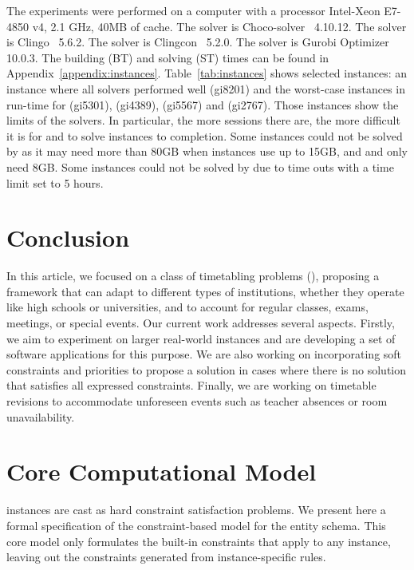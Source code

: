 \documentclass[runningheads]{llncs}
\begin{document}
%
 







The experiments were performed on a computer with a processor Intel-Xeon E7-4850 v4, 2.1 GHz, 40MB of cache.
The \CP{} solver is Choco-solver~\cite{2022_chocosolver} 4.10.12.
The \ASP{} solver is Clingo~\cite{2019_clingo} 5.6.2.
The \CASP{} solver is Clingcon~\cite{2018_casp} 5.2.0.
The \MIP{} solver is Gurobi Optimizer~\cite{2023_gurobi} 10.0.3.
The building (BT) and solving (ST) times can be found in Appendix~\ref{appendix:instances}.
Table~\ref{tab:instances} shows selected instances:
an instance where all solvers performed well (gi8201) and the worst-case instances in run-time for \CP{} (gi5301), \ASP{} (gi4389), \CASP{} (gi5567) and \MIP{} (gi2767).
Those instances show the limits of the solvers.
In particular, the more sessions there are, the more difficult it is for \ASP{} and \MIP{} to solve instances to completion.
Some instances could not be solved by \ASP{} as it may need more than 80GB when \MIP{} instances use up to 15GB, and \CP{} and \CASP{} only need 8GB.
Some instances could not be solved by \MIP{} due to time outs with a time limit set to 5 hours.

  \section{Conclusion}
\label{sec:conclusion}


In this article, we focused on a class of timetabling problems (\UTP{}), proposing a framework that can adapt to different types of institutions, whether they operate like high schools or universities, and to account for regular classes, exams, meetings, or special events.
Our current work addresses several aspects. Firstly, we aim to experiment on larger real-world instances and are developing a set of software applications for this purpose. 
We are also working on incorporating soft constraints and priorities to propose a solution in cases where there is no solution that satisfies all expressed constraints. 
Finally, we are working on timetable revisions to accommodate unforeseen events such as teacher absences or room unavailability.
 
\printbibliography

\appendix
\newpage

\section{Core Computational Model}
\label{appendix:core-model}
\UTP{} instances are cast as hard constraint satisfaction problems.
We present here a formal specification of the constraint-based model for the entity schema.
This core model only formulates the built-in constraints that apply to any instance,
leaving out the constraints generated from instance-specific rules.
\end{document}
